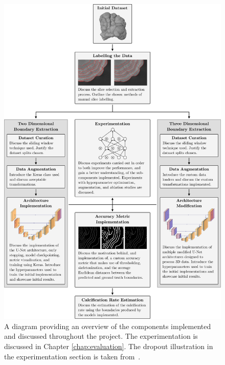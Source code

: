 \begin{figure}[!p]
    \centering
    \includegraphics[width=\textwidth]{images/overview.pdf}
    \caption{A diagram providing an overview of the components implemented and discussed throughout the project. The experimentation is discussed in Chapter \ref{chap:evaluation}. The dropout illustration in the experimentation section is taken from~\cite{dropout}.}
    \label{fig:overview}
\end{figure}

